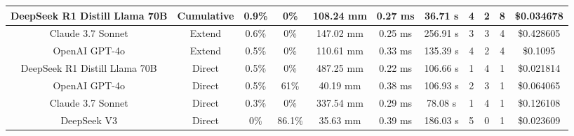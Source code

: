 \begin{landscape}
\begin{table}[H]
\begin{center}
\begin{tabular}{|c|c|c|c|c|c|c|c|c|c|c|}
    DeepSeek R1 Distill Llama 70B & Cumulative & 0.9\% & 0\% & 108.24 mm & 0.27 ms & 36.71 s & 4 & 2 & 8 & \$0.034678 \\
    \hline
    Claude 3.7 Sonnet & Extend & 0.6\% & 0\% & 147.02 mm & 0.25 ms & 256.91 s & 3 & 3 & 4 & \$0.428605 \\
    \hline
    OpenAI GPT-4o & Extend & 0.5\% & 0\% & 110.61 mm & 0.33 ms & 135.39 s & 4 & 2 & 4 & \$0.1095 \\
    \hline
    DeepSeek R1 Distill Llama 70B & Direct & 0.5\% & 0\% & 487.25 mm & 0.22 ms & 106.66 s & 1 & 4 & 1 & \$0.021814 \\
    \hline
    OpenAI GPT-4o & Direct & 0.5\% & 61\% & 40.19 mm & 0.38 ms & 106.93 s & 2 & 3 & 1 & \$0.064065 \\
    \hline
    Claude 3.7 Sonnet & Direct & 0.3\% & 0\% & 337.54 mm & 0.29 ms & 78.08 s & 1 & 4 & 1 & \$0.126108 \\
    \hline
    DeepSeek V3 & Direct & 0\% & 86.1\% & 35.63 mm & 0.39 ms & 186.03 s & 5 & 0 & 1 & \$0.023609 \\
    \hline
\end{tabular}
\label{Results-Position-3-5}
\end{center}
\end{table}


\end{landscape}

